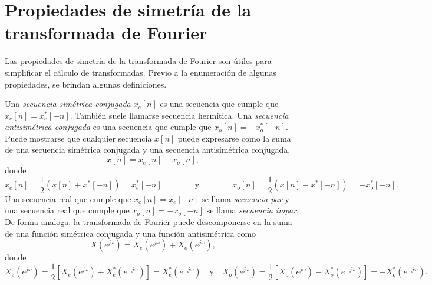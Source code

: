 \documentclass[a4paper]{report}
\begin{document}
\section{Propiedades de simetría de la transformada de Fourier}\label{sec:seq_and_sys_dtft_symmetry_properties} 
 
Las propiedades de simetría de la transformada de Fourier son útiles para simplificar el cálculo de transformadas. Previo a la enumeración de algunas propiedades, se brindan algunas definiciones. 

Una \emph{secuencia simétrica conjugada} \(x_e[n]\) es una secuencia que cumple que \(x_e[n]=x_e^*[-n]\). También suele llamarse secuencia hermítica. Una \emph{secuencia antisimétrica conjugada} es una secuencia que cumple que \(x_o[n]=-x_o^*[-n]\). Puede mostrarse que cualquier secuencia \(x[n]\) puede expresarse como la suma de una secuencia simétrica conjugada y una secuencia antisimétrica conjugada,
\[
 x[n]=x_e[n]+x_o[n],
\]
donde
\[
 x_e[n]=\frac{1}{2}(x[n]+x^*[-n])=x_e^*[-n]
 \qquad\qquad\textrm{y}\qquad\qquad
 x_o[n]=\frac{1}{2}(x[n]-x^*[-n])=-x_o^*[-n].
\]
Una secuencia real que cumple que \(x_e[n]=x_e[-n]\) se llama \emph{secuencia par} y una secuencia real que cumple que \(x_o[n]=-x_o[-n]\) se llama \emph{secuencia impar}. De forma analoga, la transformada de Fourier puede descomponerse en la suma de una función simétrica conjugada y una función antisimétrica como
\[
 X(e^{j\omega})=X_e(e^{j\omega})+X_o(e^{j\omega}),
\]
donde
\[
 X_e(e^{j\omega})=\frac{1}{2}[X_e(e^{j\omega})+X_e^*(e^{-j\omega})]=X_e^*(e^{-j\omega})
 \quad\textrm{y}\quad
 X_o(e^{j\omega})=\frac{1}{2}[X_o(e^{j\omega})-X_o^*(e^{-j\omega})]=-X_o^*(e^{-j\omega}).
\]
\end{document}
